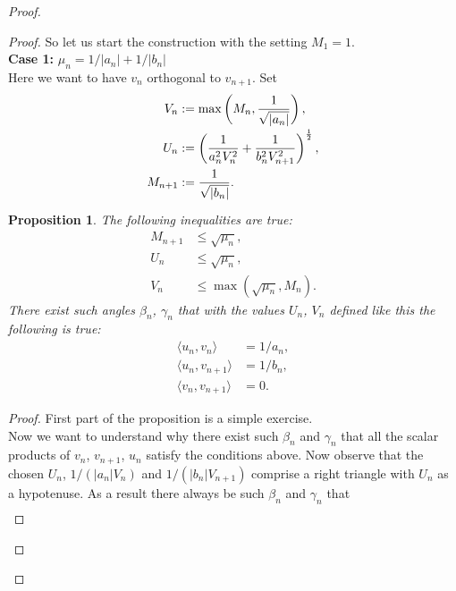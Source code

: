 \documentclass[12pt]{article}
\newcommand\inner[2]{\langle #1, #2 \rangle}
\renewcommand{\leq}{\leqslant}
\newtheorem{prop}{Proposition}
\theoremstyle{definition}
\numberwithin{remark}{section}
\numberwithin{theorem}{section}
\numberwithin{prop}{section}
\numberwithin{equation}{section}
\numberwithin{lemma}{section}
\numberwithin{prop_under_lemma}{lemma}
\begin{document}
\begin{proof}
\begin{proof}
            So let us start the construction with the setting $M_1 = 1$.\\
            \textbf{Case 1:} $\mu_n = 1/|a_n| + 1/|b_n|$\\
                Here we want to have $v_n$ orthogonal to $v_{n+1}$.
                Set
                \begin{align*}
                    V_n &:= \max\left(M_n, \frac{1}{\sqrt{\smash[b]{|a_n|}}}\right),\\
                    U_n &:= \left(\frac{1}{a_n^2 V_n^2} + \frac{1}{b_n^2 V_{n+1}^2}\right)^\frac{1}{2},\\
                    M_{n+1} &:= \frac{1}{\sqrt{\smash[b]{|b_n|}}}.
                \end{align*}
                \begin{prop}
                    The following inequalities are true:
                    \begin{align*}
                        M_{n+1} &\leq \sqrt{\mu_n},\\
                        U_n &\leq \sqrt{\mu_n},\\
                        V_n &\leq \max(\sqrt{\mu_n}, M_n).
                    \end{align*}
                    There exist such angles $\beta_n$, $\gamma_n$ that with the values $U_n$, $V_n$ defined like this the following is true:
                    \begin{align*}
                        \inner{u_n}{v_n} &= 1/a_n,\\
                        \inner{u_n}{v_{n+1}} &= 1/b_n,\\
                        \inner{v_n}{v_{n+1}} &= 0.
                    \end{align*}
                \end{prop}
                \begin{proof}
                    First part of the proposition is a simple exercise.\\
                    Now we want to understand why there exist such $\beta_n$ and $\gamma_n$ that all the scalar products of
                    $v_n$, $v_{n+1}$, $u_n$ satisfy the conditions above.
                    Now observe that the chosen $U_n$, $1/(|a_n| V_n)$ and $1/(|b_n| V_{n+1})$ 
                    comprise a right triangle with $U_n$ as a hypotenuse.
                    As a result there always be such $\beta_n$ and $\gamma_n$ that
                    \begin{align*}

\end{align*}
\end{proof}
\end{proof}
\end{proof}
\end{document}
